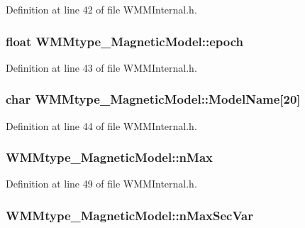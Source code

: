 Definition at line 42 of file W\-M\-M\-Internal.\-h.

\hypertarget{struct_w_m_mtype___magnetic_model_a49af71fa7bdc1e238de0f59b941ab70c}{
\subsubsection[{epoch}]{\setlength{\rightskip}{0pt plus 5cm}float W\-M\-Mtype\-\_\-\-Magnetic\-Model\-::epoch}}\label{struct_w_m_mtype___magnetic_model_a49af71fa7bdc1e238de0f59b941ab70c}


Definition at line 43 of file W\-M\-M\-Internal.\-h.

\hypertarget{struct_w_m_mtype___magnetic_model_a11d5a44016770e140c397467b40c7755}{
\subsubsection[{Model\-Name}]{\setlength{\rightskip}{0pt plus 5cm}char W\-M\-Mtype\-\_\-\-Magnetic\-Model\-::\-Model\-Name\mbox{[}20\mbox{]}}}\label{struct_w_m_mtype___magnetic_model_a11d5a44016770e140c397467b40c7755}


Definition at line 44 of file W\-M\-M\-Internal.\-h.

\hypertarget{struct_w_m_mtype___magnetic_model_ad87a370d713ab72ff5ca801d1a3a2d4c}{
\subsubsection[{n\-Max}]{ W\-M\-Mtype\-\_\-\-Magnetic\-Model\-::n\-Max}}\label{struct_w_m_mtype___magnetic_model_ad87a370d713ab72ff5ca801d1a3a2d4c}


Definition at line 49 of file W\-M\-M\-Internal.\-h.

\hypertarget{struct_w_m_mtype___magnetic_model_a957006fac5ca68a6c677f6f09d0c05b4}{
\subsubsection[{n\-Max\-Sec\-Var}]{ W\-M\-Mtype\-\_\-\-Magnetic\-Model\-::n\-Max\-Sec\-Var}}\label{struct_w_m_mtype___magnetic_model_a957006fac5ca68a6c677f6f09d0c05b4}


